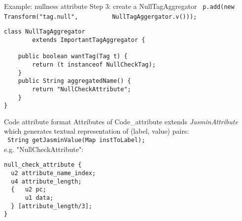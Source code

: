 \begin{slide}{Example: nullness attribute}
Step 3: create a NullTagAggregator
{\scriptsize \verb$ p.add(new Transform("tag.null",$
   \verb$         NullTagAggergator.v())); $}

{\scriptsize
\begin{verbatim}
class NullTagAggregator
        extends ImportantTagAggregator {

    public boolean wantTag(Tag t) {
        return (t instanceof NullCheckTag);
    }
    public String aggregatedName() {
        return "NullCheckAttribute"; 
    }
}
\end{verbatim}
}
\end{slide}

\begin{slide}{Code attribute format}
Attributes of Code\_attribute extends {\em JasminAttribute}
which generates textual representation of (label, value)
pairs:\\
\footnotesize{\verb$ String getJasminValue(Map instToLabel); $} \\
e.g. "NullCheckAttribute":
\footnotesize{
\begin{verbatim}
null_check_attribute {
  u2 attribute_name_index;
  u4 attribute_length;
  {   u2 pc;
      u1 data;
  } [attribute_length/3];
}
\end{verbatim}
}
\end{slide}
